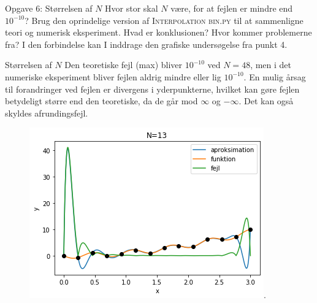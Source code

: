 \begin{frame}{Opgave 6: Størrelsen af $N$}
    Hvor stor skal $N$ være, for at fejlen er mindre end $10^{-10}$? 
    Brug den oprindelige version af \textsc{Interpolation bin.py} til at sammenligne teori og numerisk eksperiment. 
    Hvad er konklusionen? 
    Hvor kommer problemerne fra? 
    I den forbindelse kan I inddrage den grafiske undersøgelse fra punkt 4.
\end{frame}

\begin{frame}{Størrelsen af $N$}
    Den teoretiske fejl (max) bliver $10^{-10}$ ved $N=48$, men i det numeriske eksperiment bliver fejlen aldrig mindre eller lig $10^{-10}$. 
    En mulig årsag til forandringer ved fejlen er divergens i yderpunkterne, hvilket kan gøre fejlen betydeligt større end den teoretiske, da de går mod $ \infty $ og $ - \infty $. Det kan også skyldes afrundingsfejl. 
    \begin{figure}
        \centering
            \includegraphics[scale=0.45]{images/N=13.png}.
    \end{figure}
\end{frame}